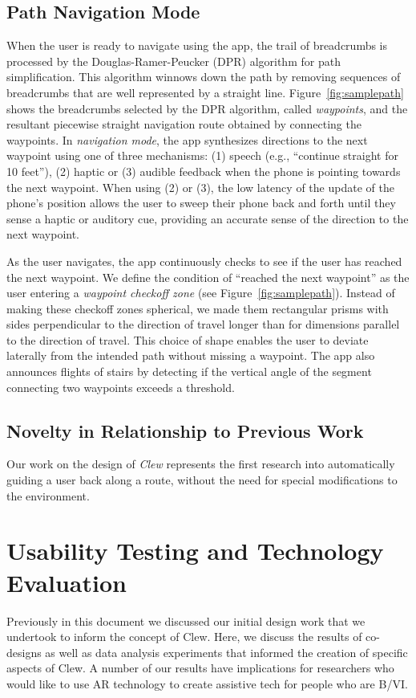 \documentclass[chi_draft]{sigchi}
\newcommand{\BVI}{B/VI\xspace}
\begin{document}
\subsection{Path Navigation Mode}\label{sec:pathnavigationmode}

When the user is ready to navigate using the app, the trail of breadcrumbs is processed by the Douglas-Ramer-Peucker (DPR) algorithm \cite{douglas1973algorithms} for path simplification.  This algorithm winnows down the path by removing sequences of breadcrumbs that are well represented by a straight line.  Figure~\ref{fig:samplepath} shows the breadcrumbs selected by the DPR algorithm, called \emph{waypoints}, and the resultant piecewise straight navigation route obtained by connecting the waypoints.  In \emph{navigation mode}, the app synthesizes directions to the next waypoint using one of three mechanisms: (1) speech (e.g., ``continue straight for 10 feet''), (2) haptic or (3) audible feedback when the phone is pointing towards the next waypoint.  When using (2) or (3), the low latency of the update of the phone's position allows the user to sweep their phone back and forth until they sense a haptic or auditory cue, providing an accurate sense of the direction to the next waypoint.

As the user navigates, the app continuously checks to see if the user has reached the next waypoint.  We define the condition of ``reached the next waypoint'' as the user entering a \emph{waypoint checkoff zone} (see Figure~\ref{fig:samplepath}).  Instead of making these checkoff zones spherical, we made them rectangular prisms with sides perpendicular to the direction of travel longer than for dimensions parallel to the direction of travel.  This choice of shape enables the user to deviate laterally from the intended path without missing a waypoint.  The app also announces flights of stairs by detecting if the vertical angle of the segment connecting two waypoints exceeds a threshold.


\subsection{Novelty in Relationship to Previous Work}
Our work on the design of \emph{Clew} represents the first research into automatically guiding a user back along a route, without the need for special modifications to the environment.

\section{Usability Testing and Technology Evaluation}\label{sec:usabilityandevaluation}
Previously in this document we discussed our initial design work that we undertook to inform the concept of Clew.  Here, we discuss the results of co-designs as well as data analysis experiments that informed the creation of specific aspects of Clew.  A number of our results have implications for researchers who would like to use AR technology to create assistive tech for people who are \BVI.
\end{document}
